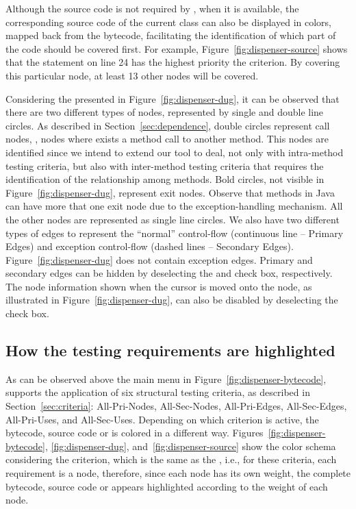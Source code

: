 Although the source code is not required by \toolname, when it is
available, the corresponding source code of the current class can
also be displayed in colors, mapped back from the bytecode,
facilitating the identification of which part of the code should
be covered first. For example, Figure~\ref{fig:dispenser-source}
shows that the statement on line 24 has the highest priority \wrt
the  criterion. By covering this particular
node, at least 13 other nodes will be covered.







Considering the \DUG presented in Figure~\ref{fig:dispenser-dug},
it can be observed that there are two different types of nodes,
represented by single and double line circles. As described in
Section~\ref{sec:dependence}, double circles represent call nodes,
\ie, nodes where exists a method call to another method. This
nodes are identified since we intend to extend our tool to deal,
not only with intra-method testing criteria, but also with
inter-method testing criteria that requires the identification of
the relationship among methods. Bold circles, not visible in
Figure~\ref{fig:dispenser-dug}, represent exit nodes. Observe that
methods in Java can have more that one exit node due to the
exception-handling mechanism. All the other nodes are represented
as single line circles. We also have two different types of edges
to represent the ``normal'' control-flow (continuous line --
Primary Edges) and exception control-flow (dashed lines --
Secondary Edges). Figure~\ref{fig:dispenser-dug} does not contain
exception edges. Primary and secondary edges can be hidden by
deselecting the  and 
check box, respectively. The node information shown when the
cursor is moved onto the node, as illustrated in
Figure~\ref{fig:dispenser-dug}, can also be disabled by
deselecting the  check box.

\subsection{How the testing requirements are highlighted}

As can be observed above the main menu in
Figure~\ref{fig:dispenser-bytecode}, \toolname supports the
application of six structural testing criteria, as described in
Section~\ref{sec:criteria}: All-Pri-Nodes, All-Sec-Nodes,
All-Pri-Edges, All-Sec-Edges, All-Pri-Uses, and All-Sec-Uses.
Depending on which criterion is active, the bytecode, source code
or \DUG is colored in a different way.
Figures~\ref{fig:dispenser-bytecode}, \ref{fig:dispenser-dug},
and~\ref{fig:dispenser-source} show the color schema considering
the  criterion, which is the same as the
, i.e., for these criteria, each requirement is
a node, therefore, since each node has its own weight, the
complete bytecode, source code or \DUG appears highlighted
according to the weight of each node.

